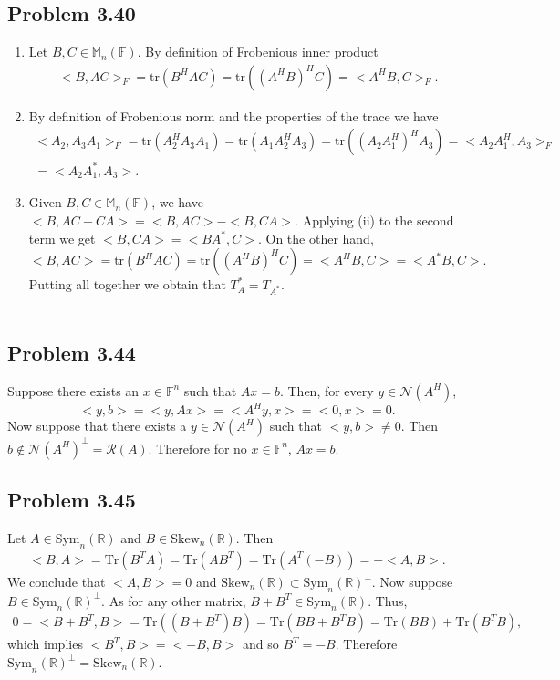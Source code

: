 \documentclass[letterpaper,12pt]{article}
\theoremstyle{definition}
\begin{document}
\begin{spacing}{1.3}{}
\subsection*{Problem 3.40}
\begin{enumerate}
    \item 
    Let $B,C\in\mathbb M_n(\mathbb F)$.
	By definition of Frobenious inner product
	\begin{align*}
	<B,AC>_F=\text{tr}(B^HAC)=\text{tr}((A^HB)^HC)=<A^HB,C>_F.
	\end{align*}
	\item
		By definition of Frobenious norm and the properties of the trace we have
	\begin{align*}
	<A_2,A_3A_1>_F=\text{tr}(A_2^HA_3A_1)=
	\text{tr}(A_1A_2^HA_3)=\text{tr}((A_2A_1^H)^HA_3)=
	<A_2A_1^H,A_3>_F\\=<A_2A_1^*,A_3>.
	\end{align*}
	\item
		Given $B,C\in\mathbb M_n(\mathbb F)$, we have $<B,AC-CA>=<B,AC>-<B,CA>$.
	Applying (ii) to the second term we get $<B,CA>=<BA^*,C>$.
	On the other hand,
	\begin{equation*}
	<B,AC>=\text{tr}(B^HAC)=\text{tr}((A^HB)^HC)=<A^HB,C>=<A^*B,C>.
	\end{equation*}
	Putting all together we obtain that $T_A^*=T_{A^*}$. \\\\
\end{enumerate}


\subsection*{Problem 3.44}
	Suppose there exists an $x\in\mathbb F^n$ such that $Ax=b$.
	Then, for every $y\in\mathcal N(A^H)$,
	$$<y,b>=<y,Ax>=<A^Hy,x>=<0,x>=0.$$
	Now suppose that there exists a $y\in\mathcal N(A^H)$ such that $<y,b>\neq0$.
	Then $b\notin\mathcal N(A^H)^\perp=\mathcal R(A)$.
	Therefore for no $x\in\mathbb F^n$, $Ax=b$. \\
	
\subsection*{Problem 3.45}
	Let $A\in\text{Sym}_n(\mathbb R)$ and $B\in\text{Skew}_n(\mathbb R)$.
	Then
	\begin{align*}
	<B,A>=\text{Tr}(B^TA)=\text{Tr}(AB^T)=
	\text{Tr}(A^T(-B))=-<A,B>.
	\end{align*}
	We conclude that $<A,B>=0$ and $\text{Skew}_n(\mathbb R)\subset\text{Sym}_n(\mathbb R)^\perp$.
	Now suppose $B\in\text{Sym}_n(\mathbb R)^\perp$.
	As for any other matrix, $B+B^T\in\text{Sym}_n(\mathbb R)$.
	Thus,
	\begin{align*}
	0 = <B+B^T,B>=\text{Tr}((B+B^T)B) =\text{Tr}(BB + B^TB)=
	\text{Tr}(BB)+\text{Tr}(B^TB),
	\end{align*}
	which implies $<B^T,B>=<-B,B>$ and so $B^T=-B$.
	Therefore $\text{Sym}_n(\mathbb R)^\perp=\text{Skew}_n(\mathbb R)$. \\
	

\end{spacing}
\end{document}

